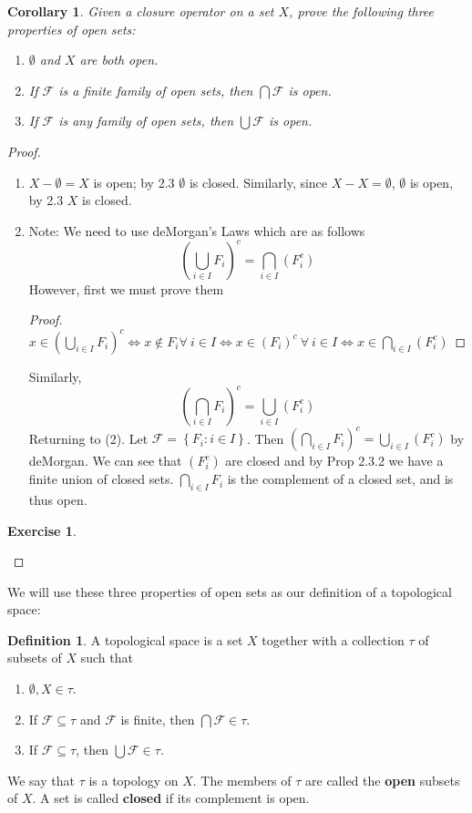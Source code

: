 \documentclass[12pt]{amsart}
\newtheorem{corollary}[theorem]{Corollary}
\newtheorem{exercise}{Exercise}[section]
\theoremstyle{definition}
\newtheorem{definition}[theorem]{Definition}
\theoremstyle{remark}
\newcommand{\0}{\emptyset}
\newcommand{\F}{\mathcal F}
\begin{document}
\begin{corollary}
Given a closure operator on a set $X$, prove the following three properties of open sets:
\begin{enumerate}
\item $\0$ and $X$ are both open.
\item If $\F$ is a finite family of open sets, then $\bigcap \F$ is open.
\item If $\F$ is any family of open sets, then $\bigcup \F$ is open.
\end{enumerate}
\end{corollary}
\begin{proof}
	\begin{enumerate}
		\item $X- \0 = X$ is open; by 2.3 $\0$ is closed. Similarly, since $X-X=\0$, $\0$ is open, by 2.3 $X$ is closed.
		\item Note: We need to use deMorgan's Laws which are as follows
		$$\left(\bigcup_{i \in I}F_i\right)^c = \bigcap_{i \in I}\left(F_i^c\right)$$
		However, first we must prove them
		\begin{proof}
			$x \in \left(\bigcup_{i \in I}F_i\right)^c \iff x \not\in F_i \forall\: i \in I \iff x \in \left(F_i\right)^c \:\forall\: i \in I \iff x \in \bigcap_{i \in I}\left(F_i^c\right)$
		\end{proof}
		Similarly,
		$$\left(\bigcap_{i \in I}F_i\right)^c = \bigcup_{i \in I}\left(F_i^c\right)$$
		Returning to (2). Let $\F = \left\{ F_i:i \in I \right\}$. Then $\left( \bigcap_{i \in I}F_i \right)^c = \bigcup_{i \in I}\left(F_i^c\right)$ by deMorgan. We can see that $\left( F_i^c \right)$ are closed and by Prop 2.3.2 we have a finite union of closed sets. $\bigcap_{i \in I}F_i$ is the complement of a closed set, and is thus open.
	\end{enumerate}
\begin{exercise}\end{exercise}
\end{proof}

We will use these three properties of open sets as our definition of a topological space:

\begin{definition}
A topological space is a set $X$ together with a collection $\tau$ of subsets of $X$ such that
\begin{enumerate}
\item $\0, X \in \tau$.
\item If $\F \subseteq \tau$ and $\F$ is finite, then $\bigcap \F \in \tau$.
\item If $\F \subseteq \tau$, then $\bigcup \F \in \tau$.
\end{enumerate}
We say that $\tau$ is a topology on $X$. The members of $\tau$ are called the \textbf{open} subsets of $X$. A set is called \textbf{closed} if its complement is open.
\end{definition}
\end{document}
